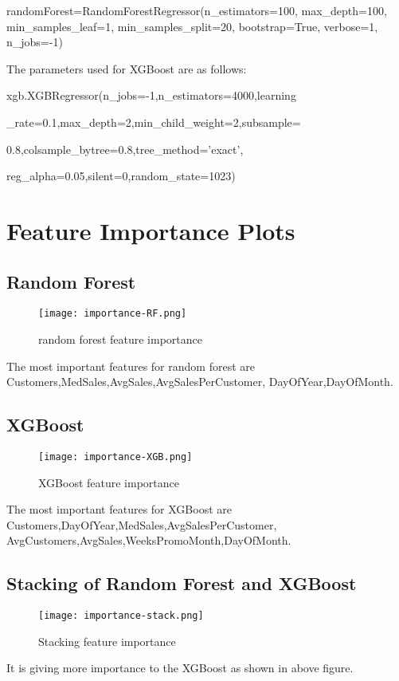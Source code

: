 \documentclass[letterpaper, 10 pt, conference]{ieeeconf}  %
\begin{document}
\bigskip

randomForest=RandomForestRegressor(n\_estimators=100, max\_depth=100, min\_samples\_leaf=1, min\_samples\_split=20, bootstrap=True, verbose=1, n\_jobs=-1)

\bigskip

The parameters used for XGBoost are as follows:

\bigskip

xgb.XGBRegressor(n\_jobs=-1,n\_estimators=4000,learning

\_rate=0.1,max\_depth=2,min\_child\_weight=2,subsample=

0.8,colsample\_bytree=0.8,tree\_method='exact',

reg\_alpha=0.05,silent=0,random\_state=1023)

\newpage
\section{Feature Importance Plots}
\subsection{Random Forest}
\begin{figure}[h!]
    \centering
    \texttt{[image: importance-RF.png]}
    \caption{random forest feature importance}
\end{figure}
The most important features for random forest are Customers,MedSales,AvgSales,AvgSalesPerCustomer,
DayOfYear,DayOfMonth.
\subsection{XGBoost}
\begin{figure}[h!]
    \centering
    \texttt{[image: importance-XGB.png]}
    \caption{XGBoost feature importance}
\end{figure}
The most important features for XGBoost are Customers,DayOfYear,MedSales,AvgSalesPerCustomer,
AvgCustomers,AvgSales,WeeksPromoMonth,DayOfMonth.

\subsection{Stacking of Random Forest and XGBoost}
\begin{figure}[h!]
    \centering
    \texttt{[image: importance-stack.png]}
    \caption{Stacking feature importance}
\end{figure}
It is giving more importance to the XGBoost as shown in above figure.
\end{document}
